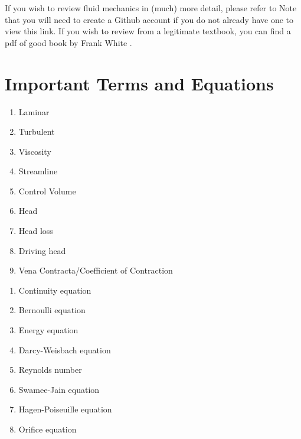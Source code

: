\documentclass[letterpaper,10pt,english]{sphinxmanual}
\begin{document}
If you wish to review fluid mechanics in (much) more detail, please refer to  Note that you will need to create a Github account if you do not already have one to view this link. If you wish to review from a legitimate textbook, you can find a pdf of good book by Frank White .


\section{Important Terms and Equations}
\label{\detokenize{Fluids_Review/Fluids_Review_Design:important-terms-and-equations}}\label{\detokenize{Fluids_Review/Fluids_Review_Design:fluids-terms-eqs}}
\begin{enumerate}
\item {} 
Laminar

\item {} 
Turbulent

\item {} 
Viscosity

\item {} 
Streamline

\item {} 
Control Volume

\item {} 
Head

\item {} 
Head loss

\item {} 
Driving head

\item {} 
Vena Contracta/Coefficient of Contraction

\end{enumerate}

\begin{enumerate}
\item {} 
Continuity equation

\item {} 
Bernoulli equation

\item {} 
Energy equation

\item {} 
Darcy-Weisbach equation

\item {} 
Reynolds number

\item {} 
Swamee-Jain equation

\item {} 
Hagen-Poiseuille equation

\item {} 
Orifice equation

\end{enumerate}
\end{document}
